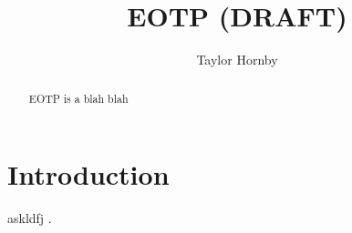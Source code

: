 \documentclass[letterpaper,twocolumn,10pt]{article} %
\title{EOTP (DRAFT)}
\author{Taylor Hornby}
\begin{document}
\maketitle

\begin{abstract}
EOTP is a blah blah
\end{abstract}

\section{Introduction}

askldfj \citep{Shwartz2011QHardening}.




\end{document}
